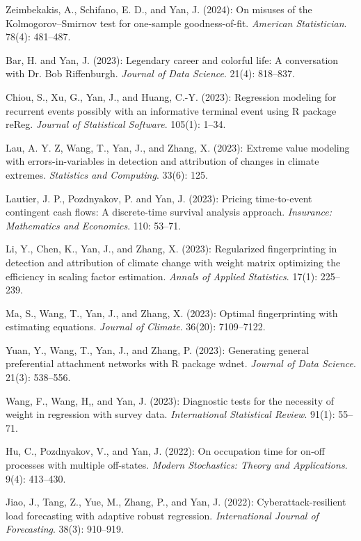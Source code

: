 \documentclass[Statistics]{vita}
\begin{document}
\begin{vita}
\begin{Publications}
\begin{RefereedJournalArticles}
  \item *Zeimbekakis, A., Schifano, E. D., and Yan, J. (2024): On misuses of the Kolmogorov--Smirnov test for one-sample goodness-of-fit. {\em American Statistician\/}. 78(4): 481--487.
  \item Bar, H. and Yan, J. (2023): Legendary career and colorful life: A conversation with Dr. Bob Riffenburgh. {\em Journal of Data Science\/}. 21(4): 818--837.
  \item Chiou, S., Xu, G., Yan, J., and Huang, C.-Y. (2023): Regression modeling for recurrent events possibly with an informative terminal event using R package {reReg}. {\em Journal of Statistical Software\/}. 105(1): 1--34.
  \item *Lau, A. Y. Z, Wang, T., Yan, J., and Zhang, X. (2023): Extreme value modeling with errors-in-variables in detection and attribution of changes in climate extremes. {\em Statistics and Computing\/}. 33(6): 125.
  \item *Lautier, J. P., Pozdnyakov, P. and Yan, J. (2023): Pricing time-to-event contingent cash flows: A discrete-time survival analysis approach. {\em Insurance: Mathematics and Economics\/}. 110: 53--71.
  \item *Li, Y., Chen, K., Yan, J., and Zhang, X. (2023): Regularized fingerprinting in detection and attribution of climate change with weight matrix optimizing the efficiency in scaling factor estimation. {\em Annals of Applied Statistics\/}. 17(1): 225--239.
   \item *Ma, S., Wang, T., Yan, J., and Zhang, X. (2023): Optimal fingerprinting with estimating equations. {\em Journal of Climate\/}. 36(20): 7109--7122.
  \item *Yuan, Y., Wang, T., Yan, J., and Zhang, P. (2023): Generating general preferential attachment networks with R package {wdnet}. {\em Journal of Data Science\/}. 21(3): 538--556.
  \item *Wang, F., Wang, H,, and Yan, J. (2023): Diagnostic tests for the necessity of weight in regression with survey data. {\em International Statistical Review\/}. 91(1): 55--71.
  \item *Hu, C., Pozdnyakov, V., and Yan, J. (2022): On occupation time for on-off processes with multiple off-states. {\em Modern Stochastics: Theory and Applications\/}. 9(4): 413--430.
  \item *Jiao, J., Tang, Z., Yue, M., Zhang, P., and Yan, J. (2022): Cyberattack-resilient load forecasting with adaptive robust regression. {\em International Journal of Forecasting\/}. 38(3): 910--919.

\end{RefereedJournalArticles}
\end{Publications}
\end{vita}
\end{document}
